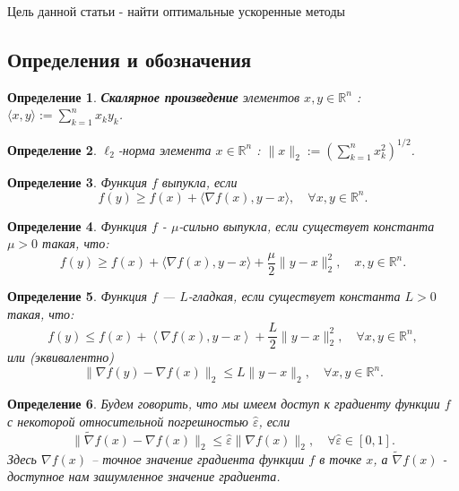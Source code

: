 \documentclass{article}
\newcommand{\R}{\mathbb{R}}
\newtheorem{Def}{Определение}[section]
\begin{document}
Цель данной статьи - найти оптимальные ускоренные методы 

\subsection{\textbf{Определения и обозначения}}


\begin{Def}
\textbf{Скалярное произведение} элементов $x,y \in \R^n$ : $\langle x,y \rangle := \sum\limits_{k=1}^n x_ky_k$.
\end{Def}

\begin{Def}
$\ell_2$-норма элемента $x \in \R^n$ : $\|x\|_2 := \left(\sum\limits_{k=1}^n x_k^2\right)^{1/2}$.
\end{Def}

\begin{Def}
Функция $f$ выпукла, если 
\begin{equation}
    f(y) \geq f(x)+\langle\nabla f(x), y-x\rangle, \quad \forall x, y \in \mathbb{R}^n.
\end{equation}
\end{Def}

\begin{Def}
Функция $f$ - $\mu$-сильно выпукла, если существует константа $\mu > 0$ такая, что:
    \begin{equation}\label{eq:str_cvx}
        f(y) \geq f(x) + \langle \nabla f(x), y - x \rangle + \frac{\mu}{2}\|y - x\|_2^2, \quad x, y \in \R^n. 
    \end{equation}
\end{Def}

\begin{Def}
Функция $f$ --- $L$-гладкая, если существует константа $L > 0$ такая, что:
\begin{equation}\label{smoothness_cond}
    f(y) \leq f(x)+ \left\langle\nabla f(x), y-x\right\rangle + \frac{L}{2} \|y-x\|_2^2, \quad \forall x, y \in \mathbb{R}^n,
\end{equation}
или (эквивалентно) 
\begin{equation}\label{eq_6}
    \|\nabla f(y) - \nabla f(x)\|_2 \leq L \|y - x\|_2, \quad \forall x, y \in \mathbb{R}^n.
\end{equation}
\end{Def}

\begin{Def}
Будем говорить, что мы имеем доступ к градиенту функции $f$ с некоторой относительной погрешностью $\hat{\varepsilon}$, если
\begin{equation}\label{eq_relative_error}
    \|\widetilde{\nabla} f(x) - \nabla f(x)\|_2 \leq \hat{\varepsilon} \|\nabla f(x)\|_2, \quad \forall \hat{\varepsilon} \in [0, 1].
\end{equation}
Здесь $\nabla f(x)$ -- точное значение градиента функции $f$ в точке $x$, а $\widetilde{\nabla} f(x)$ - доступное нам зашумленное значение градиента.
\end{Def}
\end{document}
